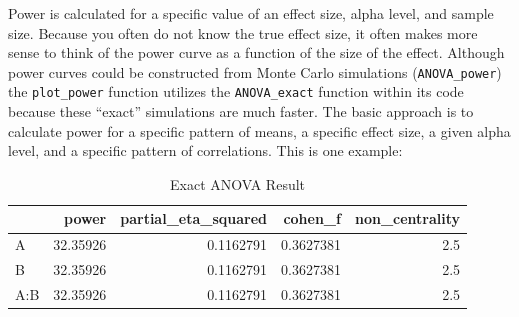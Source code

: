 \documentclass[
]{book}
\newenvironment{Shaded}{\begin{snugshade}}{\end{snugshade}}
\newcommand{\CommentTok}[1]{\textcolor[rgb]{0.56,0.35,0.01}{\textit{#1}}}
\newcommand{\DataTypeTok}[1]{\textcolor[rgb]{0.13,0.29,0.53}{#1}}
\newcommand{\DecValTok}[1]{\textcolor[rgb]{0.00,0.00,0.81}{#1}}
\newcommand{\FloatTok}[1]{\textcolor[rgb]{0.00,0.00,0.81}{#1}}
\newcommand{\KeywordTok}[1]{\textcolor[rgb]{0.13,0.29,0.53}{\textbf{#1}}}
\newcommand{\NormalTok}[1]{#1}
\newcommand{\OtherTok}[1]{\textcolor[rgb]{0.56,0.35,0.01}{#1}}
\newcommand{\StringTok}[1]{\textcolor[rgb]{0.31,0.60,0.02}{#1}}
\begin{document}
Power is calculated for a specific value of an effect size, alpha level, and sample size. Because you often do not know the true effect size, it often makes more sense to think of the power curve as a function of the size of the effect. Although power curves could be constructed from Monte Carlo simulations (\texttt{ANOVA\_power}) the \texttt{plot\_power} function utilizes the \texttt{ANOVA\_exact} function within its code because these ``exact'' simulations are much faster. The basic approach is to calculate power for a specific pattern of means, a specific effect size, a given alpha level, and a specific pattern of correlations. This is one example:

\begin{Shaded}
\end{Shaded}

\begin{table}[!h]

\caption{\label{tab:unnamed-chunk-276}Exact ANOVA Result}
\centering
\begin{tabular}[t]{l|r|r|r|r}
\hline
  & power & partial\_eta\_squared & cohen\_f & non\_centrality\\
\hline
A & 32.35926 & 0.1162791 & 0.3627381 & 2.5\\
\hline
B & 32.35926 & 0.1162791 & 0.3627381 & 2.5\\
\hline
A:B & 32.35926 & 0.1162791 & 0.3627381 & 2.5\\
\hline
\end{tabular}
\end{table}
\pagebreak
\end{document}
